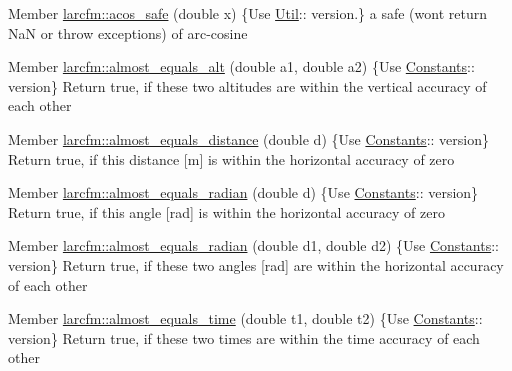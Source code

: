 
\begin{DoxyRefList}
\item[Member \mbox{\hyperlink{namespacelarcfm_ac4e3373b544011eeb577edbcc55731d4}{larcfm\+::acos\+\_\+safe}} (double x)]\label{deprecated__deprecated000030}%
%
\{Use \mbox{\hyperlink{classlarcfm_1_1_util}{Util}}\+:\+: version.\} a safe (won\textquotesingle{}t return NaN or throw exceptions) of arc-\/cosine  
\item[Member \mbox{\hyperlink{namespacelarcfm_ada29d8e82eae8bfdf2af2cb8996f6f1c}{larcfm\+::almost\+\_\+equals\+\_\+alt}} (double a1, double a2)]\label{deprecated__deprecated000015}%
%
\{Use \mbox{\hyperlink{classlarcfm_1_1_constants}{Constants}}\+:\+: version\} Return true, if these two altitudes are within the vertical accuracy of each other  
\item[Member \mbox{\hyperlink{namespacelarcfm_add0a4db29574843a09e22e720caf8ec5}{larcfm\+::almost\+\_\+equals\+\_\+distance}} (double d)]\label{deprecated__deprecated000012}%
%
\{Use \mbox{\hyperlink{classlarcfm_1_1_constants}{Constants}}\+:\+: version\} Return true, if this distance \mbox{[}m\mbox{]} is within the horizontal accuracy of zero  
\item[Member \mbox{\hyperlink{namespacelarcfm_a576eb51d883a869796dabd83683685ab}{larcfm\+::almost\+\_\+equals\+\_\+radian}} (double d)]\label{deprecated__deprecated000014}%
%
\{Use \mbox{\hyperlink{classlarcfm_1_1_constants}{Constants}}\+:\+: version\} Return true, if this angle \mbox{[}rad\mbox{]} is within the horizontal accuracy of zero  
\item[Member \mbox{\hyperlink{namespacelarcfm_aedda4aff3b46a1e88a1d65664cee8e22}{larcfm\+::almost\+\_\+equals\+\_\+radian}} (double d1, double d2)]\label{deprecated__deprecated000013}%
%
\{Use \mbox{\hyperlink{classlarcfm_1_1_constants}{Constants}}\+:\+: version\} Return true, if these two angles \mbox{[}rad\mbox{]} are within the horizontal accuracy of each other  
\item[Member \mbox{\hyperlink{namespacelarcfm_a7d5bf6cb3799dba8d7552d3165932cc7}{larcfm\+::almost\+\_\+equals\+\_\+time}} (double t1, double t2)]\label{deprecated__deprecated000010}%
%
\{Use \mbox{\hyperlink{classlarcfm_1_1_constants}{Constants}}\+:\+: version\} Return true, if these two times are within the time accuracy of each other  

\end{DoxyRefList}
